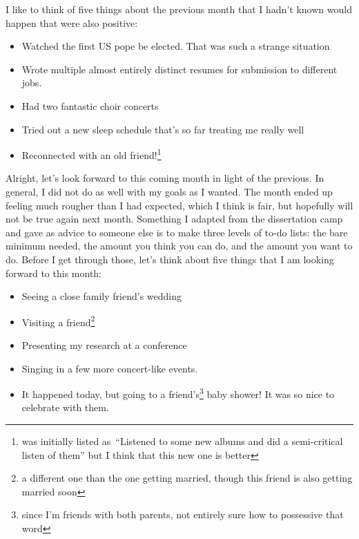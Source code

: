 \documentclass[12pt]{article}
\newcommand{\say}[1]{``#1''}
\renewcommand{\,}{\textsuperscript{,}}
\begin{document}
I like to think of five things about the previous month that I hadn't known would happen that were also positive:

\begin{itemize}

\item Watched the first US pope be elected. That was such a strange situation

\item Wrote multiple almost entirely distinct resumes for submission to different jobs.

\item Had two fantastic choir concerts

\item Tried out a new sleep schedule that's so far treating me really well

\item Reconnected with an old friend!\footnote{was initially listed as \say{Listened to some new albums and did a semi-critical listen of them} but I think that this new one is better}

\end{itemize}

Alright, let's look forward to this coming month in light of the previous.  
In general, I did not do as well with my goals as I wanted.  
The month ended up feeling much rougher than I had expected, which I think is fair, but hopefully will not be true again next month.  
Something I adapted from the dissertation camp and gave as advice to someone else is to make three levels of to-do lists: the bare minimum needed, the amount you think you can do, and the amount you want to do.  
Before I get through those, let's think about five things that I am looking forward to this month:

\begin{itemize}

\item Seeing a close family friend's wedding

\item Visiting a friend\footnote{a different one than the one getting married, though this friend is also getting married soon}

\item Presenting my research at a conference

\item Singing in a few more concert-like events.

\item It happened today, but going to a friend's\footnote{since I'm friends with both parents, not entirely sure how to possessive that word} baby shower! It was so nice to celebrate with them.

\end{itemize}
\end{document}
